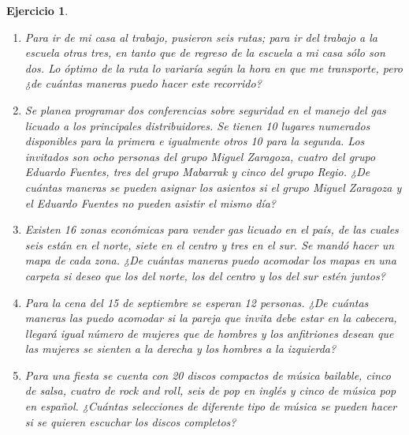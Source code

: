 \documentclass[12pt,twoside]{article}
\newtheorem{Ejer}{Ejercicio}
\begin{document}
\begin{Ejer}
\begin{enumerate}
\item Para ir de mi casa al trabajo, pusieron seis rutas; para ir del trabajo a la escuela otras tres, en tanto que de regreso de la escuela a mi casa sólo son dos. Lo óptimo de la ruta lo variaría según la hora en que me transporte, pero ¿de cuántas maneras puedo hacer este recorrido?

\item Se planea programar dos conferencias sobre seguridad en el manejo del gas licuado a los principales distribuidores. Se tienen 10 lugares numerados disponibles para la primera e igualmente otros 10 para la segunda. Los invitados son ocho personas del grupo Miguel Zaragoza, cuatro del grupo Eduardo Fuentes, tres del grupo Mabarrak y cinco del grupo Regio. ¿De cuántas maneras se pueden asignar los asientos si el grupo Miguel Zaragoza y el Eduardo Fuentes no pueden asistir el mismo día?

\item Existen 16 zonas económicas para vender gas licuado en el país, de las cuales seis están en el norte, siete en el centro y tres en el sur. Se mandó hacer un mapa de cada zona. ¿De cuántas maneras puedo acomodar los mapas en una carpeta si deseo que los del norte, los del centro y los del sur estén juntos?

\item Para la cena del 15 de septiembre se esperan 12 personas. ¿De cuántas maneras las puedo acomodar si la pareja que invita debe estar en la cabecera, llegará igual número de mujeres que de hombres y los anfitriones desean que las mujeres se sienten a la derecha y los hombres a la izquierda?

\item Para una fiesta se cuenta con 20 discos compactos de música bailable, cinco de salsa, cuatro de rock and roll, seis de pop en inglés y cinco de música pop en español. ¿Cuántas selecciones de diferente tipo de música se pueden hacer si se quieren escuchar los discos completos?

\end{enumerate}
\end{Ejer}
\end{document}
